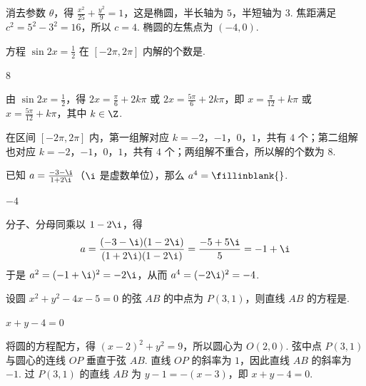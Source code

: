 \begin{solution}
消去参数 \(\theta\)，得
\(\frac{x^2}{25}+\frac{y^2}{9}=1\)，这是椭圆，半长轴为 \(5\)，半短轴为 \(3\). 焦距满足 \(c^2=5^2-3^2=16\)，所以 \(c=4\). 椭圆的左焦点为 \((-4,0)\).
\end{solution}

\begin{problem}
方程 \(\sin 2x = \frac{1}{2}\) 在 \(\left[-2\pi, 2\pi\right]\) 内解的个数是\fillinblank{}.
\end{problem}

\begin{answer}
8
\end{answer}

\begin{solution}
由 \(\sin 2x=\frac12\)，得
\(2x=\frac{\pi}{6}+2k\pi\) 或 \(2x=\frac{5\pi}{6}+2k\pi\)，即
\(x=\frac{\pi}{12}+k\pi\) 或 \(x=\frac{5\pi}{12}+k\pi\)，其中 \(k\in\Z\).

在区间 \([-2\pi,2\pi]\) 内，第一组解对应 \(k=-2\)，\(-1\)，\(0\)，\(1\)，共有 \(4\) 个；第二组解也对应 \(k=-2\)，\(-1\)，\(0\)，\(1\)，共有 \(4\) 个；两组解不重合，所以解的个数为 \(8\).
\end{solution}

\begin{problem}
已知 \(a=\frac{-3-\i}{1+2\i}\)（\(\i\) 是虚数单位），那么 \(a^4=\fillinblank{}\).
\end{problem}

\begin{answer}
\(-4\)
\end{answer}

\begin{solution}
分子、分母同乘以 \(1-2\i\)，得
\[
a=\frac{(-3-\i)(1-2\i)}{(1+2\i)(1-2\i)}=\frac{-5+5\i}{5}=-1+\i
\]
于是 \(a^2=(-1+\i)^2=-2\i\)，从而
\(a^4=(-2\i)^2=-4\).
\end{solution}

\begin{problem}
设圆 \(x^2+y^2-4x-5=0\) 的弦 \(AB\) 的中点为 \(P(3,1)\)，则直线 \(AB\) 的方程是\fillinblank{}.
\end{problem}

\begin{answer}
\(x+y-4=0\)
\end{answer}

\begin{solution}
将圆的方程配方，得 \((x-2)^2+y^2=9\)，所以圆心为 \(O(2,0)\). 弦中点 \(P(3,1)\) 与圆心的连线 \(OP\) 垂直于弦 \(AB\). 直线 \(OP\) 的斜率为 \(1\)，因此直线 \(AB\) 的斜率为 \(-1\). 过 \(P(3,1)\) 的直线 \(AB\) 为
\(y-1=-(x-3)\)，即 \(x+y-4=0\).
\end{solution}

